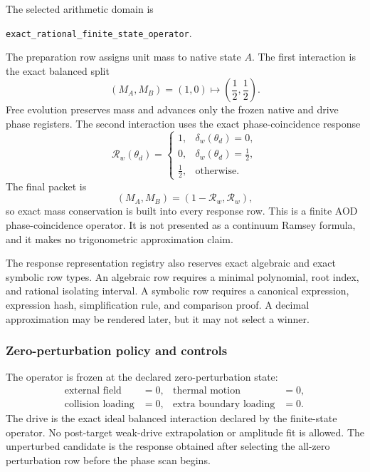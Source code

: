 The selected arithmetic domain is
\begin{center}
\small\texttt{exact\_rational\_finite\_state\_operator}.
\end{center}
The preparation row assigns unit mass to native state $A$.  The first
interaction is the exact balanced split
\[
(M_A,M_B)=(1,0)
\longmapsto
\left(\frac12,\frac12\right).
\]
Free evolution preserves mass and advances only the frozen native and drive
phase registers.  The second interaction uses the exact phase-coincidence
response
\[
\mathcal R_w(\theta_d)
=
\begin{cases}
1,&\delta_w(\theta_d)=0,\\
0,&\delta_w(\theta_d)=\frac12,\\
\frac12,&\text{otherwise}.
\end{cases}
\]
The final packet is
\[
(M_A,M_B)
=
(1-\mathcal R_w,\mathcal R_w),
\]
so exact mass conservation is built into every response row.  This is a finite
AOD phase-coincidence operator. It is not presented as a continuum Ramsey
formula, and it makes no trigonometric approximation claim.

The response representation registry also reserves exact algebraic and exact
symbolic row types.  An algebraic row requires a minimal polynomial, root
index, and rational isolating interval.  A symbolic row requires a canonical
expression, expression hash, simplification rule, and comparison proof.  A
decimal approximation may be rendered later, but it may not select a winner.

\subsubsection{Zero-perturbation policy and controls}

The operator is frozen at the declared zero-perturbation state:
\[
\begin{aligned}
\text{external field}&=0,&
\text{thermal motion}&=0,\\
\text{collision loading}&=0,&
\text{extra boundary loading}&=0.
\end{aligned}
\]
The drive is the exact ideal balanced interaction declared by the finite-state
operator.  No post-target weak-drive extrapolation or amplitude fit is allowed.
The unperturbed candidate is the response obtained after selecting the all-zero
perturbation row before the phase scan begins.

